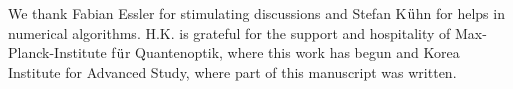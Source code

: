 \documentclass[twocolumn,superscriptaddress, prb]{revtex4-1}
\begin{document}

We thank Fabian Essler for stimulating discussions and Stefan K${\rm{\ddot u}}$hn for helps in numerical algorithms.
H.K. is grateful for the support and hospitality of Max-Planck-Institute f${\rm{\ddot u}}$r Quantenoptik,
where this work has begun and Korea Institute for Advanced Study, where part of this manuscript was written.



\end{document}

